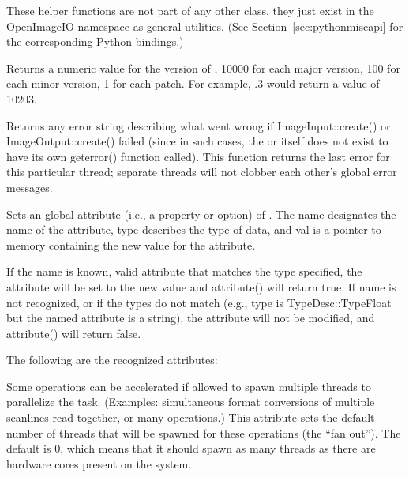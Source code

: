 These helper functions are not part of any other \OpenImageIO class,
they just exist in the {\cf OpenImageIO} namespace as general utilities.
(See Section~\ref{sec:pythonmiscapi} for the corresponding Python
bindings.)

Returns a numeric value for the version of \product, 10000 for each
major version, 100 for each minor version, 1 for each patch.  For
example, .3 would return a value of 10203.
\apiend

Returns any error string describing what went wrong if 
{\cf ImageInput::create()} or \\ {\cf ImageOutput::create()} failed
(since in such cases, the \ImageInput or \ImageOutput itself does 
not exist to have its own {\cf geterror()} function called).
This function returns the last error
for this particular thread; separate threads will not clobber each
other's global error messages.
\apiend


\label{sec:globalattribute}

Sets an global attribute (i.e., a property or option) of \product.
The {\cf name} designates the name of the attribute, {\cf type}
describes the type of data, and {\cf val} is a pointer to memory 
containing the new value for the attribute.

If the name is known, valid attribute that matches the type specified,
the attribute will be set to the new value and {\cf attribute()} will
return {\cf true}.  If {\cf name} is not recognized, or if the types do
not match (e.g., {\cf type} is {\cf TypeDesc::TypeFloat} but the named
attribute is a string), the attribute will not be modified, and {\cf
  attribute()} will return {\cf false}.

\noindent The following are the recognized attributes:

\vspace{10pt}
 \label{sec:attribute:threads}
Some \product operations can be accelerated if allowed to spawn multiple
threads to parallelize the task.  (Examples: simultaneous format conversions
of multiple scanlines read together, or many \ImageBufAlgo operations.)
This attribute sets the default number of threads that will be spawned
for these operations (the ``fan out'').
The default is 0, which means that it should spawn as many
threads as there are hardware cores present on the system.

